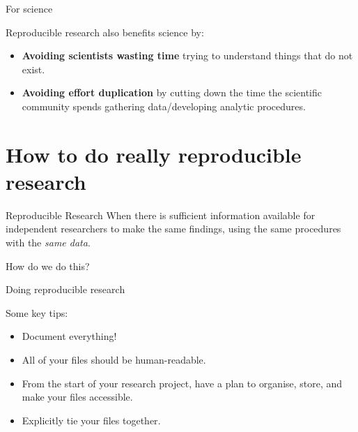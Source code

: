 \documentclass[10pt]{beamer}
\begin{document}
\begin{frame}{For science}

    Reproducible research also benefits science by:

    \begin{itemize}
        \item \textbf{Avoiding scientists wasting time} trying to understand things that do not exist.

        \vspace{0.5cm}

        \item \textbf{Avoiding effort duplication} by cutting down the time the scientific community spends gathering data/developing analytic procedures.
    \end{itemize}


\end{frame}

\section{How to do really reproducible research}

\begin{frame}

\begin{exampleblock}{Reproducible Research}
    When there is sufficient information available for independent researchers to make the same findings, using the same procedures with the \emph{same data}.
\end{exampleblock}

    \vspace{1cm}

    \begin{center}
        {\LARGE{How do we do this?}}
    \end{center}

\end{frame}

\begin{frame}{Doing reproducible research}

    {\large{Some key tips:}}

    \begin{itemize}

        \item \alert{Document everything!}

        \item All of your files should be \alert{human-readable}.

        \item \alert{From the start} of your research project, have a plan to \alert{organise}, store, and make your files accessible.

        \item Explicitly \alert{tie your files together}.
    \end{itemize}

\end{frame}
\end{document}
